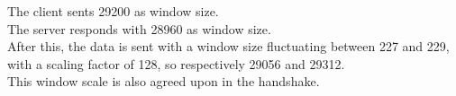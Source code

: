 The client sents 29200 as window size.\\
The server responds with 28960 as window size.\\
After this, the data is sent with a window size fluctuating between 227 and 229, with a scaling factor of 128, so respectively 29056 and 29312.\\
This window scale is also agreed upon in the handshake.\\